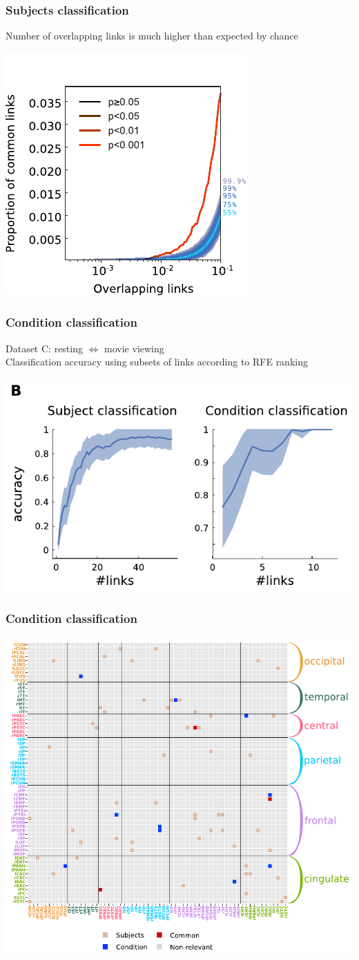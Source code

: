 \documentclass[final]{beamer}
\begin{document}
\begin{frame}
\frametitle{Subjects classification}
Number of overlapping links is much higher than expected by chance
\begin{center}
\includegraphics[width=0.5\columnwidth]{subj_H0}
\end{center}
\end{frame}

\begin{frame}
\frametitle{Condition classification}
Dataset C: resting $\Leftrightarrow$ movie viewing\\[0.4cm]
\pause
Classification accuracy using subsets of links according to RFE ranking
\begin{center}
\includegraphics[width=0.8\columnwidth]{subj_cond_results}
\end{center}
\end{frame}

\begin{frame}
\frametitle{Condition classification}
\begin{center}
\includegraphics[width=0.65\columnwidth]{subj_cond_matrix}
\end{center}
\end{frame}
\end{document}
